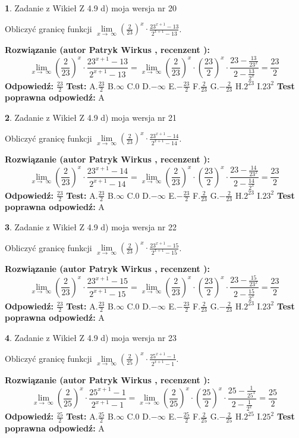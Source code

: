 \documentclass[12pt, a4paper]{article}
\theoremstyle{definition} %
\newtheorem{zad}{}
\newcommand{\zadStart}[1]{\begin{zad}#1\newline}
\newcommand{\zadStop}{\end{zad}}
\newcommand{\rozwStart}[2]{\noindent \textbf{Rozwiązanie (autor #1 , recenzent #2): }\newline}
\newcommand{\rozwStop}{\newline}
\newcommand{\odpStart}{\noindent \textbf{Odpowiedź:}\newline}
\newcommand{\odpStop}{\newline}
\newcommand{\testStart}{\noindent \textbf{Test:}\newline}
\newcommand{\testStop}{\newline}
\newcommand{\kluczStart}{\noindent \textbf{Test poprawna odpowiedź:}\newline}
\newcommand{\kluczStop}{\newline}
\begin{document}
\zadStart{Zadanie z Wikieł Z 4.9 d) moja wersja nr 20}


Obliczyć granicę funkcji  $\lim\limits_{x\to\ \infty}(\frac{2}{23})^{x}\cdot\frac{23^{x+1}-13}{2^{x+1}-13}$.
\zadStop
\rozwStart{Patryk Wirkus}{}
$$\lim\limits_{x\to\ \infty}(\frac{2}{23})^{x}\cdot\frac{23^{x+1}-13}{2^{x+1}-13}=\lim\limits_{x\to\ \infty}(\frac{2}{23})^{x}\cdot(\frac{23}{2})^{x} \cdot \frac{23-\frac{13}{23^{x}}}{2-\frac{13}{2^{x}}} = \frac{23}{2}$$
\rozwStop
\odpStart
$\frac{23}{2}$
\odpStop
\testStart
A.$\frac{23}{2}$ B.$\infty$ C.$0$ D.$-\infty$ E.$-\frac{23}{2}$
F.$\frac{2}{23}$ G.$-\frac{2}{23}$
H.$2^{23}$
I.$23^{2}$
\testStop
\kluczStart
A
\kluczStop



\zadStart{Zadanie z Wikieł Z 4.9 d) moja wersja nr 21}


Obliczyć granicę funkcji  $\lim\limits_{x\to\ \infty}(\frac{2}{23})^{x}\cdot\frac{23^{x+1}-14}{2^{x+1}-14}$.
\zadStop
\rozwStart{Patryk Wirkus}{}
$$\lim\limits_{x\to\ \infty}(\frac{2}{23})^{x}\cdot\frac{23^{x+1}-14}{2^{x+1}-14}=\lim\limits_{x\to\ \infty}(\frac{2}{23})^{x}\cdot(\frac{23}{2})^{x} \cdot \frac{23-\frac{14}{23^{x}}}{2-\frac{14}{2^{x}}} = \frac{23}{2}$$
\rozwStop
\odpStart
$\frac{23}{2}$
\odpStop
\testStart
A.$\frac{23}{2}$ B.$\infty$ C.$0$ D.$-\infty$ E.$-\frac{23}{2}$
F.$\frac{2}{23}$ G.$-\frac{2}{23}$
H.$2^{23}$
I.$23^{2}$
\testStop
\kluczStart
A
\kluczStop



\zadStart{Zadanie z Wikieł Z 4.9 d) moja wersja nr 22}


Obliczyć granicę funkcji  $\lim\limits_{x\to\ \infty}(\frac{2}{23})^{x}\cdot\frac{23^{x+1}-15}{2^{x+1}-15}$.
\zadStop
\rozwStart{Patryk Wirkus}{}
$$\lim\limits_{x\to\ \infty}(\frac{2}{23})^{x}\cdot\frac{23^{x+1}-15}{2^{x+1}-15}=\lim\limits_{x\to\ \infty}(\frac{2}{23})^{x}\cdot(\frac{23}{2})^{x} \cdot \frac{23-\frac{15}{23^{x}}}{2-\frac{15}{2^{x}}} = \frac{23}{2}$$
\rozwStop
\odpStart
$\frac{23}{2}$
\odpStop
\testStart
A.$\frac{23}{2}$ B.$\infty$ C.$0$ D.$-\infty$ E.$-\frac{23}{2}$
F.$\frac{2}{23}$ G.$-\frac{2}{23}$
H.$2^{23}$
I.$23^{2}$
\testStop
\kluczStart
A
\kluczStop



\zadStart{Zadanie z Wikieł Z 4.9 d) moja wersja nr 23}


Obliczyć granicę funkcji  $\lim\limits_{x\to\ \infty}(\frac{2}{25})^{x}\cdot\frac{25^{x+1}-1}{2^{x+1}-1}$.
\zadStop
\rozwStart{Patryk Wirkus}{}
$$\lim\limits_{x\to\ \infty}(\frac{2}{25})^{x}\cdot\frac{25^{x+1}-1}{2^{x+1}-1}=\lim\limits_{x\to\ \infty}(\frac{2}{25})^{x}\cdot(\frac{25}{2})^{x} \cdot \frac{25-\frac{1}{25^{x}}}{2-\frac{1}{2^{x}}} = \frac{25}{2}$$
\rozwStop
\odpStart
$\frac{25}{2}$
\odpStop
\testStart
A.$\frac{25}{2}$ B.$\infty$ C.$0$ D.$-\infty$ E.$-\frac{25}{2}$
F.$\frac{2}{25}$ G.$-\frac{2}{25}$
H.$2^{25}$
I.$25^{2}$
\testStop
\kluczStart
A
\kluczStop
\end{document}
